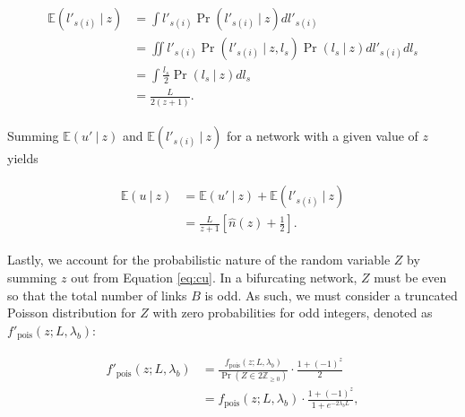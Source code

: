 \documentclass[11pt, class=article, crop=false]{standalone}
\begin{document}
\begin{align}
    \begin{split}
        \mathbb{E}(l'_{s(i)}~|~z)
        &= \int l'_{s(i)} \Pr(l'_{s(i)}~|~z) dl'_{s(i)}\\
        &= \iint l'_{s(i)} \Pr(l'_{s(i)}~|~z, l_s) \Pr(l_s~|~z) dl'_{s(i)} dl_s \\
        &= \int \frac{l_s}{2} \Pr(l_s~|~z) dl_s \\
        &= \frac{L}{2(z + 1)}.
    \end{split}
\end{align}



Summing $\mathbb{E}(u' ~|~ z)$ and $\mathbb{E}(l'_{s(i)}~|~z)$ for a network with a given value of $z$ yields

\begin{align}
    \begin{split}
        \mathbb{E}(u ~|~ z) 
        &= \mathbb{E}(u' ~|~ z) + \mathbb{E}(l'_{s(i)}~|~z)\\
        &= \frac{L}{z+1} \left[ \hat{n}(z) + \frac{1}{2} \right].
    \end{split}
    \label{eq:cu}
\end{align}

Lastly, we account for the probabilistic nature of the random variable $Z$ by summing $z$ out from Equation \ref{eq:cu}.
In a bifurcating network, $Z$ must be even so that the total number of links $B$ is odd.
As such, we must consider a truncated Poisson distribution for $Z$ with zero probabilities for odd integers, denoted as $f'_{\text{pois}}(z; L, \lambda_b)$:

\begin{align}
    \begin{split}
    f'_{\text{pois}}(z; L, \lambda_b) 
    &= \frac{f_{\text{pois}}(z; L, \lambda_b)}{\Pr(Z \in 2\mathbb{Z}_{\ge 0})} \cdot \frac{1 + (-1)^{z}}{2}\\
    &= f_{\text{pois}}(z; L, \lambda_b) \cdot \frac{1 + (-1)^{z}}{1 + e^{-2\lambda_b L}},
    \end{split}
    \label{eq:tpois}
\end{align}
\end{document}
